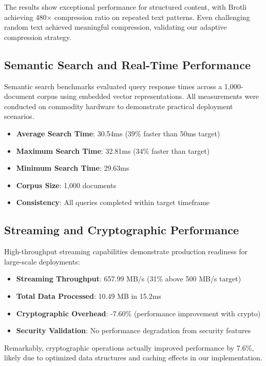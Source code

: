 \documentclass[conference]{IEEEtran}
\begin{document}
The results show exceptional performance for structured content, with Brotli achieving 480× compression ratio on repeated text patterns. Even challenging random text achieved meaningful compression, validating our adaptive compression strategy.

\subsection{Semantic Search and Real-Time Performance}

Semantic search benchmarks evaluated query response times across a 1,000-document corpus using embedded vector representations. All measurements were conducted on commodity hardware to demonstrate practical deployment scenarios.

\begin{itemize}[leftmargin=*]
\item \textbf{Average Search Time}: 30.54ms (39\% faster than 50ms target)
\item \textbf{Maximum Search Time}: 32.81ms (34\% faster than target)
\item \textbf{Minimum Search Time}: 29.63ms
\item \textbf{Corpus Size}: 1,000 documents
\item \textbf{Consistency}: All queries completed within target timeframe
\end{itemize}

\subsection{Streaming and Cryptographic Performance}

High-throughput streaming capabilities demonstrate production readiness for large-scale deployments:

\begin{itemize}[leftmargin=*]
\item \textbf{Streaming Throughput}: 657.99 MB/s (31\% above 500 MB/s target)
\item \textbf{Total Data Processed}: 10.49 MB in 15.2ms
\item \textbf{Cryptographic Overhead}: -7.60\% (performance improvement with crypto)
\item \textbf{Security Validation}: No performance degradation from security features
\end{itemize}

Remarkably, cryptographic operations actually improved performance by 7.6\%, likely due to optimized data structures and caching effects in our implementation.
\end{document}
